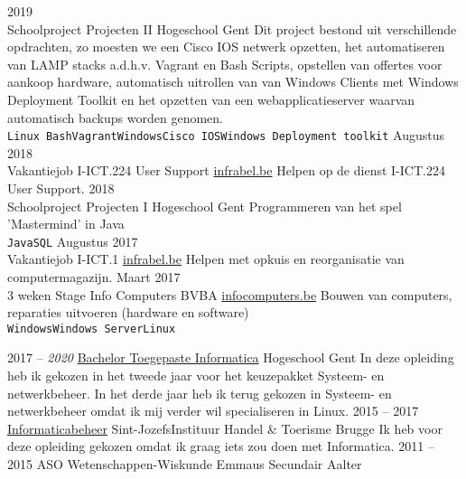 \documentclass[9pt]{developercv} %
\begin{document}
\begin{entrylist}
	\entry
		{2019\\\footnotesize{Schoolproject}}
		{Projecten II}
		{Hogeschool Gent}
		{Dit project bestond uit verschillende opdrachten, zo moesten we een Cisco IOS netwerk opzetten, het automatiseren van LAMP stacks a.d.h.v. Vagrant en Bash Scripts, opstellen van offertes voor aankoop hardware, automatisch uitrollen van van Windows Clients met Windows Deployment Toolkit en het opzetten van een webapplicatieserver waarvan automatisch backups worden genomen.
		\\ \texttt{Linux Bash}\slashsep\texttt{Vagrant}\slashsep\texttt{Windows}\slashsep\texttt{Cisco IOS}\slashsep\texttt{Windows Deployment toolkit}}
	\entry
	    {Augustus 2018\\\footnotesize{Vakantiejob}}
	    {I-ICT.224 User Support}
	    {\href{https://www.infrabel.be/}{infrabel.be}}
	    {Helpen op de dienst I-ICT.224 User Support.}
	\entry
		{2018\\\footnotesize{Schoolproject}}
		{Projecten I}
		{Hogeschool Gent}
		{Programmeren van het spel 'Mastermind' in Java\\
		\texttt{Java}\slashsep\texttt{SQL}}
	\entry
	    {Augustus 2017\\\footnotesize{Vakantiejob}}
	    {I-ICT.1}
	    {\href{https://www.infrabel.be/}{infrabel.be}}
	    {Helpen met opkuis en reorganisatie van computermagazijn.}
	\entry
		{Maart 2017\\\footnotesize{3 weken}}
		{Stage Info Computers BVBA}
		{\href{https://www.infocomputers.be/}{infocomputers.be}}
		{Bouwen van computers, reparaties uitvoeren (hardware en software)\\
		\texttt{Windows}\slashsep\texttt{Windows Server}\slashsep\texttt{Linux}}
\end{entrylist}



\begin{entrylist}
	\entry
		{2017 -- \textit{2020}}
		{\href{https://www.hogent.be/opleidingen/bachelors/toegepaste-informatica/}{Bachelor Toegepaste Informatica}}
		{Hogeschool Gent}
		{In deze opleiding heb ik gekozen in het tweede jaar voor het keuzepakket Systeem- en netwerkbeheer. In het derde jaar heb ik terug gekozen in Systeem- en netwerkbeheer omdat ik mij verder wil specialiseren in Linux. }
	\entry
		{2015 -- 2017}
		{\href{https://www.sintjozefbrugge.be/5e-en-6e-netwerken-en-it/}{Informaticabeheer}}
		{Sint-JozefsInstituur Handel \& Toerisme Brugge}
		{Ik heb voor deze opleiding gekozen omdat ik graag iets zou doen met Informatica.}
	\entry
		{2011 -- 2015}
		{ASO Wetenschappen-Wiskunde}
		{Emmaus Secundair Aalter}
		{ }
\end{entrylist}
\end{document}
